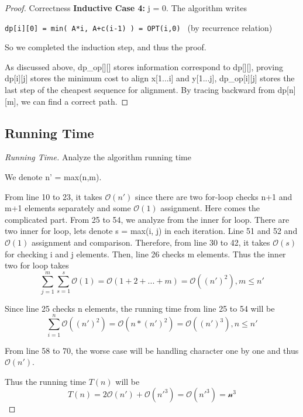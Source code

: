 \documentclass[openany]{article}
\begin{document}
\begin{proof}{Correctness}
     \textbf{Inductive Case 4:} j = 0. The algorithm writes 
    \begin{center}
        \texttt{dp[i][0] = min( A*i, A+c(i-1) ) = OPT(i,0) } (by recurrence relation)
    \end{center}
    
    So we completed the induction step, and thus the proof.
    
    As discussed above, dp\_op[][] stores information correspond to dp[][], proving dp[i][j] stores the minimum cost to align x[1...i] and y[1...j], dp\_op[i][j] stores the last step of the cheapest sequence for alignment. By tracing backward from dp[n][m], we can find a correct path.
\end{proof}

\subsection*{Running Time}
\begin{proof}[Running Time]{Analyze the algorithm running time}
    	\renewcommand{\qedsymbol}{}
    	
    	We denote n' = max(n,m).
    	
    	From line 10 to 23, it takes $\mathcal{O}(n')$ since there are two for-loop checks n+1 and m+1 elements separately and some $\mathcal{O}(1)$ assignment. Here comes the complicated part. From 25 to 54, we analyze from the inner for loop. There are two inner for loop, lets denote s = max(i, j) in each iteration. Line 51 and 52 and $\mathcal{O}(1)$ assignment and comparison. Therefore, from line 30 to 42, it takes $\mathcal{O}(s)$ for checking i and j elements. Then, line 26 checks m elements. Thus the inner two for loop takes
    	\[\sum_{j=1}^{m}\sum_{s=1}^{s}\mathcal{O}(1) = \mathcal{O}(1+2+...+m) = \mathcal{O}((n')^2), m\leq n'\]
    	
    	Since line 25 checks n elements, the running time from line 25 to 54 will be \[\sum_{i=1}^{n}\mathcal{O}((n')^2) = \mathcal{O}(n*(n')^2)=\mathcal{O}((n')^3), n\leq n'\]
    	
    	From line 58 to 70, the worse case will be handling character one by one and thus $\mathcal{O}(n')$.
    	
    	Thus the running time $T(n)$ will be \[T(n)=2\mathcal{O}(n')+\mathcal{O}(n'^3)=\mathcal{O}(n'^3) = \mathcal{n^3}\]
\end{proof}
\end{document}
